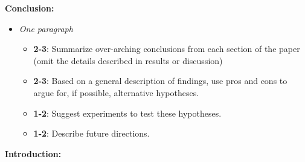 \documentclass[
]{krantz}
\providecommand{\tightlist}{%
  \setlength{\itemsep}{0pt}\setlength{\parskip}{0pt}}
\begin{document}
\textbf{Conclusion:}

\begin{itemize}
\tightlist
\item
  \emph{One paragraph}

  \begin{itemize}
  \tightlist
  \item
    \textbf{2-3}: Summarize over-arching conclusions from each section of the paper (omit the details described in results or discussion)
  \item
    \textbf{2-3}: Based on a general description of findings, use pros and cons to argue for, if possible, alternative hypotheses.
  \item
    \textbf{1-2}: Suggest experiments to test these hypotheses.
  \item
    \textbf{1-2}: Describe future directions.
  \end{itemize}
\end{itemize}

\textbf{Introduction:}
\end{document}
